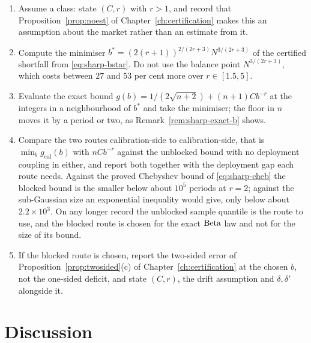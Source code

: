 \documentclass[../../../main.tex]{subfiles}
\begin{document}
\begin{enumerate}[nosep,label=\arabic*.]
\item Assume a class: state $(C,r)$ with $r>1$, and record that Proposition~\ref{prop:noest} of Chapter~\ref{ch:certification} makes this an assumption about the market rather than an estimate from it.
\item Compute the minimiser $b^*=(2(r+1))^{2/(2r+3)}N^{3/(2r+3)}$ of the certified shortfall from \eqref{eq:sharp-bstar}. Do not use the balance point $N^{3/(2r+3)}$, which costs between $27$ and $53$ per cent more over $r\in[1.5,5]$.
\item Evaluate the exact bound $g(b)=1/(2\sqrt{n+2})+(n+1)Cb^{-r}$ at the integers in a neighbourhood of $b^*$ and take the minimiser; the floor in $n$ moves it by a period or two, as Remark~\ref{rem:sharp-exact-b} shows.
\item Compare the two routes calibration-side to calibration-side, that is $\min_bg_{\mathrm{cal}}(b)$ with $nCb^{-r}$ against the unblocked bound with no deployment coupling in either, and report both together with the deployment gap each route needs. Against the proved Chebyshev bound of \eqref{eq:sharp-cheb} the blocked bound is the smaller below about $10^5$ periods at $r=2$; against the sub-Gaussian size an exponential inequality would give, only below about $2.2\times10^3$. On any longer record the unblocked sample quantile is the route to use, and the blocked route is chosen for the exact $\operatorname{Beta}$ law and not for the size of its bound.
\item If the blocked route is chosen, report the two-sided error of Proposition~\ref{prop:twosided}(c) of Chapter~\ref{ch:certification} at the chosen $b$, not the one-sided deficit, and state $(C,r)$, the drift assumption and $\delta,\delta'$ alongside it.
\end{enumerate}


\section{Discussion}\label{sec:sharp-discussion}
\end{document}

